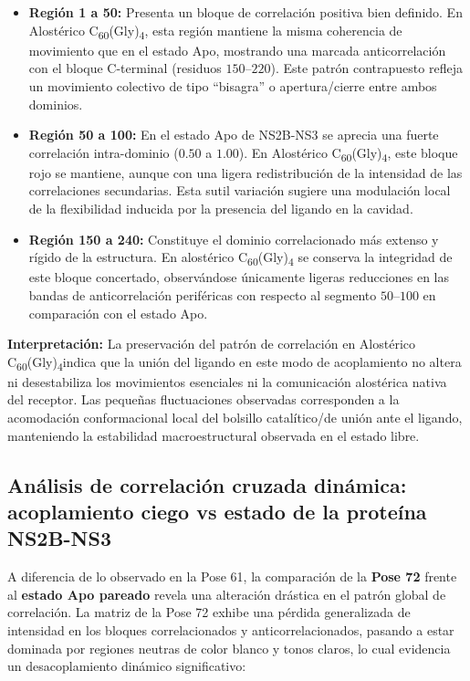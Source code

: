 \begin{itemize}
    \item \textbf{Región 1 a 50:} Presenta un bloque de correlación positiva bien definido. En Alostérico C\textsubscript{60}(Gly)\textsubscript{4}, esta región mantiene la misma coherencia de movimiento que en el estado Apo, mostrando una marcada anticorrelación con el bloque C-terminal (residuos $150$--$220$). Este patrón contrapuesto refleja un movimiento colectivo de tipo ``bisagra'' o apertura/cierre entre ambos dominios.
    
    \item \textbf{Región 50 a 100:} En el estado Apo de NS2B-NS3 se aprecia una fuerte correlación intra-dominio ($0.50$ a $1.00$). En Alostérico C\textsubscript{60}(Gly)\textsubscript{4}, este bloque rojo se mantiene, aunque con una ligera redistribución de la intensidad de las correlaciones secundarias. Esta sutil variación sugiere una modulación local de la flexibilidad inducida por la presencia del ligando en la cavidad.
    
    \item \textbf{Región 150 a 240:} Constituye el dominio correlacionado más extenso y rígido de la estructura. En alostérico C\textsubscript{60}(Gly)\textsubscript{4} se conserva la integridad de este bloque concertado, observándose únicamente ligeras reducciones en las bandas de anticorrelación periféricas con respecto al segmento $50$--$100$ en comparación con el estado Apo.
\end{itemize}

\textbf{Interpretación:} La preservación del patrón de correlación en Alostérico C\textsubscript{60}(Gly)\textsubscript{4}indica que la unión del ligando en este modo de acoplamiento no altera ni desestabiliza los movimientos esenciales ni la comunicación alostérica nativa del receptor. Las pequeñas fluctuaciones observadas corresponden a la acomodación conformacional local del bolsillo catalítico/de unión ante el ligando, manteniendo la estabilidad macroestructural observada en el estado libre.

\subsection*{Análisis de correlación cruzada dinámica: acoplamiento ciego vs estado de la proteína NS2B-NS3}

A diferencia de lo observado en la Pose 61, la comparación de la \textbf{Pose 72} frente al \textbf{estado Apo pareado} revela una alteración drástica en el patrón global de correlación. La matriz de la Pose 72 exhibe una pérdida generalizada de intensidad en los bloques correlacionados y anticorrelacionados, pasando a estar dominada por regiones neutras de color blanco y tonos claros, lo cual evidencia un desacoplamiento dinámico significativo:

